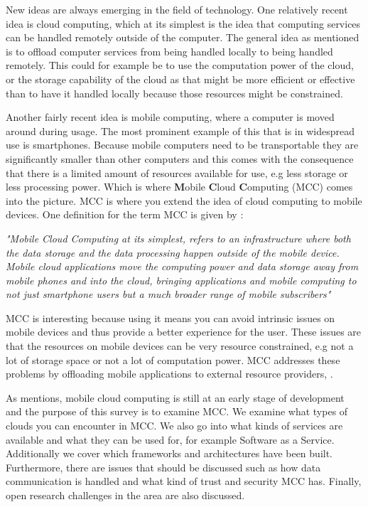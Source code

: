New ideas are always emerging in the field of technology.
One relatively recent idea is cloud computing, which at its simplest is the idea that computing services can be handled remotely outside of the computer. 
The general idea as mentioned is to offload computer services from being handled locally to being handled remotely. 
This could for example be to use the computation power of the cloud, or the storage capability of the cloud as that might be more efficient or effective than to have it handled locally because those resources might be constrained.

Another fairly recent idea is mobile computing, where a computer is moved around during usage.
The most prominent example of this that is in widespread use is smartphones.
Because mobile computers need to be transportable they are significantly smaller than other computers and this comes with the consequence that there is a limited amount of resources available for use, e.g less storage or less processing power.
Which is where \textbf{M}obile \textbf{C}loud \textbf{C}omputing (MCC) comes into the picture. 
MCC is where you extend the idea of cloud computing to mobile devices.
One definition for the term MCC is given by \citet{article:mobilecloudreviewinderkildesecurity}:

\textit{"Mobile Cloud Computing at its simplest, refers to an infrastructure where both the data storage and the data processing happen outside of the mobile device. Mobile cloud applications move the computing power and data storage away from mobile phones and into the cloud, bringing applications and mobile computing to not just smartphone users but a much broader range of mobile subscribers"}

MCC is interesting because using it means you can avoid intrinsic issues on mobile devices and thus provide a better experience for the user. 
These issues are that the resources on mobile devices can be very resource constrained, e.g not a lot of storage space or not a lot of computation power.
MCC addresses these problems by offloading mobile applications to external resource providers, \citet{fernando2013mobile}.

As \citet{6215350} mentions, mobile cloud computing is still at an early stage of development and the purpose of this survey is to examine MCC. 
We examine what types of clouds you can encounter in MCC.
We also go into what kinds of services are available and what they can be used for, for example Software as a Service.
Additionally we cover which frameworks and architectures have been built. 
Furthermore, there are issues that should be discussed such as how data communication is handled and what kind of trust and security MCC has. 
Finally, open research challenges in the area are also discussed. 